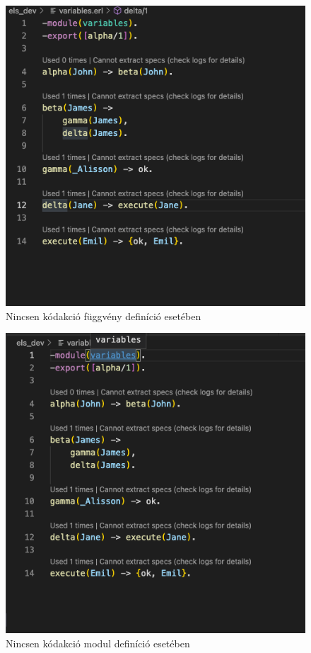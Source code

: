 \begin{figure}[H]
  \centering
  \includegraphics[width=0.7\linewidth]{images/testCases/NoCodeActFun.png}
  \caption{Nincsen kódakció függvény definíció esetében}
  \label{fig:NoCodeActFun}
\end{figure}

\begin{figure}[H]
  \centering
  \includegraphics[width=0.7\linewidth]{images/testCases/NoCodeActMod.png}
  \caption{Nincsen kódakció modul definíció esetében}
  \label{fig:NoCodeActMod}
\end{figure}

